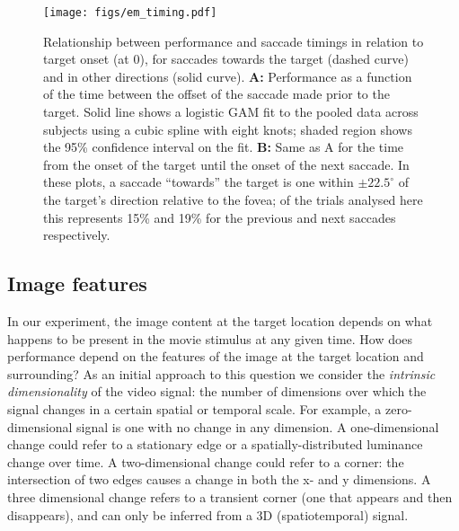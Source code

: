 \documentclass[11pt,a4paper]{article}
\begin{document}
\begin{figure}[H]
\centering
\texttt{[image: figs/em\_timing.pdf]}
\caption{
Relationship between performance and saccade timings in relation to target onset (at 0), for saccades towards the target (dashed curve) and in other directions (solid curve).
\textbf{A:} Performance as a function of the time between the offset of the saccade made prior to the target.
Solid line shows a logistic GAM fit to the pooled data across subjects using a cubic spline with eight knots; shaded region shows the 95\% confidence interval on the fit.
\textbf{B:} Same as A for the time from the onset of the target until the onset of the next saccade.
In these plots, a saccade ``towards'' the target is one within $\pm 22.5^\circ$ of the target's direction relative to the fovea; of the trials analysed here this represents 15\% and 19\% for the previous and next saccades respectively.
}
\label{fig:em_timings}
\end{figure}

\subsection{Image features}
\label{sec:image_features}

In our experiment, the image content at the target location depends on what happens to be present in the movie stimulus at any given time.
How does performance depend on the features of the image at the target location and surrounding?
As an initial approach to this question we consider the \textit{intrinsic dimensionality} of the video signal: the number of dimensions over which the signal changes in a certain spatial or temporal scale.
For example, a zero-dimensional signal is one with no change in any dimension.
A one-dimensional change could refer to a stationary edge or a spatially-distributed luminance change over time.
A two-dimensional change could refer to a corner: the intersection of two edges causes a change in both the x- and y dimensions.
A three dimensional change refers to a transient corner (one that appears and then disappears), and can only be inferred from a 3D (spatiotemporal) signal.
\end{document}
